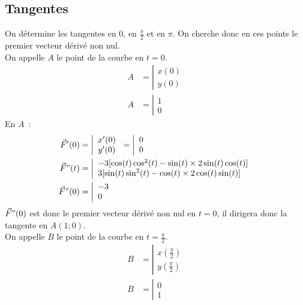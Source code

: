 \documentclass{article}
\begin{document}
\subsection{Tangentes}
On détermine les tangentes en $0$, en $\frac{\pi}{2}$ et en $\pi$.
On cherche donc en ces points le premier vecteur dérivé non nul.\\
On appelle $A$ le point de la courbe en $t=0$.
\begin{align*}
        A&=\left|\begin{array}{l}x(0)\\y(0)\end{array}\right.\\
                A&=\left|\begin{array}{l}1\\0\end{array}\right.
\end{align*}
En $A$~:
\begin{align*}
        \vec{F}'(0)&=\left|\begin{array}{l}
                x'(0)\\y'(0)
        \end{array}\right.
        =          \left|\begin{array}{l}
                0\\0
        \end{array}\right.\\
        \vec{F}"(t)&=\left|\begin{array}{l}
                -3[\cos(t)\cos^2(t) - \sin(t)\times 2\sin(t)\cos(t)]\\
                 3[\sin(t)\sin^2(t) - \cos(t)\times 2\cos(t)\sin(t)]\\
        \end{array}\right.\\
        \vec{F}"(0)&=\left|\begin{array}{l}
                -3\\0
        \end{array}\right.
\end{align*}
$\vec{F}"(0)$ est donc le premier vecteur dérivé non nul en $t=0$, il dirigera donc la tangente en $A(1;0)$.\\
On appelle $B$ le point de la courbe en $t=\frac{\pi}{2}$.
\begin{align*}
        B&=\left|\begin{array}{l}x(\frac{\pi}{2})\\y(\frac{\pi}{2})\end{array}\right.\\
                B&=\left|\begin{array}{l}0\\1\end{array}\right.
\end{align*}
\end{document}
